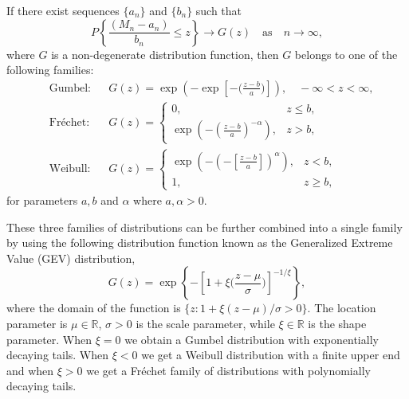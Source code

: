 \documentclass[
]{article}
\begin{document}
\begin{theorem}\label{thm:FisherTippett}
    If there exist sequences $\{a_n\}$ and $\{b_n\}$ such that
    $$
        P\left\{ \frac{(M_n - a_n)}{b_n} \leq z \right\} \rightarrow G(z) \quad \text{as} \quad n \to \infty,
    $$
    where $G$ is a non-degenerate distribution function, then $G$ belongs to one of the following families:
    \begin{align}\label{eq:EVT3}
        &\text{Gumbel} :  && G(z) = \exp\left(-\exp \left[- \Big(\frac{z-b}{a}\Big) \right] \right), \quad -\infty < z < \infty , \\
        &\text{Fréchet} : && G(z) =
        \begin{cases}
            0 ,                                                           & z \leq b  , \\
            \exp \left( - \left( \frac{z-b}{a}\right)^{-\alpha} \right) , & z > b    ,
        \end{cases}                     \\
        &\text{Weibull} : && G(z) =
        \begin{cases}
            \exp \left( - \left(- \left[\frac{z-b}{a}\right]\right)^{\alpha} \right) , & z < b  ,    \\
            1 ,                                                                        & z \geq b  ,
        \end{cases}
    \end{align}
    for parameters $a, b$ and $\alpha$ where $a, \alpha >0$.
\end{theorem}

These three families of distributions can be further combined into a
single family by using the following distribution function known as the
Generalized Extreme Value (GEV) distribution,
\begin{equation}\label{eq:EVT4}
    G(z) = \exp\left\{ -\left[ 1 + \xi\Big(\frac{z - \mu}{\sigma} \Big)\right]^{-1/\xi} \right\} ,
\end{equation} where the domain of the function is
\(\{z: 1 + \xi (z - \mu)/\sigma >0 \}\). The location parameter is
\(\mu\in\mathbb{R}\), \(\sigma>0\) is the scale parameter, while
\(\xi\in\mathbb{R}\) is the shape parameter. When \(\xi = 0\) we obtain
a Gumbel distribution with exponentially decaying tails. When
\(\xi < 0\) we get a Weibull distribution with a finite upper end and
when \(\xi > 0\) we get a Fréchet family of distributions with
polynomially decaying tails.
\end{document}
